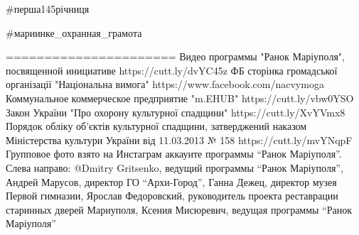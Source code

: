 \#перша145річниця 

\#мариинке\_охранная\_грамота

======================
Видео программы "Ранок Маріуполя", посвященной инициативе https://cutt.ly/dvYC45z 
ФБ сторінка громадської організації "Національна вимога" https://www.facebook.com/nacvymoga
Коммунальное коммерческое предприятие "m.EHUB" https://cutt.ly/vbw0YSO
Закон України "Про охорону культурної спадщини" https://cutt.ly/XvYVmx8 
Порядок обліку об'єктів культурної спадщини, затверджений наказом Міністерства культури України від 11.03.2013 № 158 https://cutt.ly/mvYNqpF 
Групповое фото взято на Инстаграм аккаунте программы \enquote{Ранок Маріуполя}. Слева
направо: @Dmitry Gritsenko, ведущий программы \enquote{Ранок Маріуполя}, Андрей
Марусов, директор ГО \enquote{Архи-Город}, Ганна Дежец, директор музея Первой гимназии,
Ярослав Федоровский, руководитель проекта реставрации старинных дверей
Мариуполя, Ксения Мисюревич, ведущая программы \enquote{Ранок Маріуполя}
